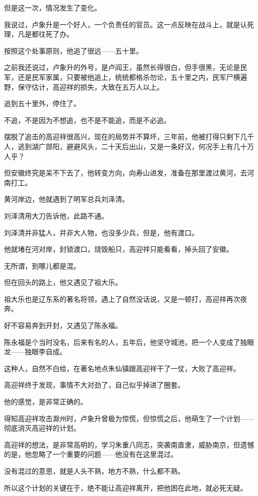 \begin{multicols}{\theparacolNo}
		但是这一次，情况发生了变化。

		我说过，卢象升是一个好人，一个负责任的官员。这一点反映在战斗上，就是认死理，凡是都往死了办。

		按照这个处事原则，他追了很远——五十里。

		之前我还说过，卢象升的外号，是卢阎王，虽然长得很白，但手很黑，无论是民军，还是民军家属，只要被他追上，统统都格杀勿论，五十里之内，民军尸横遍野，保守估计，高迎祥的损失，大致在五万人以上。

		追到五十里外，停住了。

		不追，不是因为不想追，也不是不能追，而是不必追。

		摆脱了追击的高迎祥很高兴，现在的局势并不算坏，三年前，他被打得只剩下几千人，逃到湖广郧阳，避避风头，二十天后出山，又是一条好汉，何况手上有几十万人乎？

		但安徽终究是呆不下去了，他转变方向，向寿山进发，准备在那里渡过黄河，去河南打工。

		黄河岸边，他就遇到了明军总兵刘泽清。

		刘泽清用大刀告诉他，此路不通。

		刘泽清并非猛人，并非大人物，也没多少兵，但是，他有渡口。

		他就堵在河对岸，封锁渡口，烧毁船只，高迎祥只能看看，掉头回了安徽。

		无所谓，到哪儿都是混。

		但在回头的路上，他又遇见了祖大乐。

		祖大乐也是辽东系的著名将领，遇上了自然没话说，又是一顿打，高迎祥再次夜奔。

		好不容易奔到开封，又遇见了陈永福。

		陈永福是个当时没名，后来有名的人，五年后，他坚守城池，把一个人变成了独眼龙——独眼李自成。

		这种人，自然不白给，在著名地点朱仙镇跟高迎祥干了一仗，大败了高迎祥。

		高迎祥终于发现，事情不大对劲了，自己似乎掉进了圈套。

		他的感觉，是非常正确的。

		得知高迎祥攻击滁州时，卢象升曾极为惊慌，但惊慌之后，他萌生了一个计划——彻底消灭高迎祥的计划。

		高迎祥的想法，是非常高明的，学习朱重八同志，突袭南直隶，威胁南京，但遗憾的是，他忽略了一个重要的问题——他没有在这里混过。

		没有混过的意思，就是人头不熟，地方不熟，什么都不熟。

		所以这个计划的关键在于，绝不能让高迎祥离开，把他困在此地，就必死无疑。


\end{multicols}
